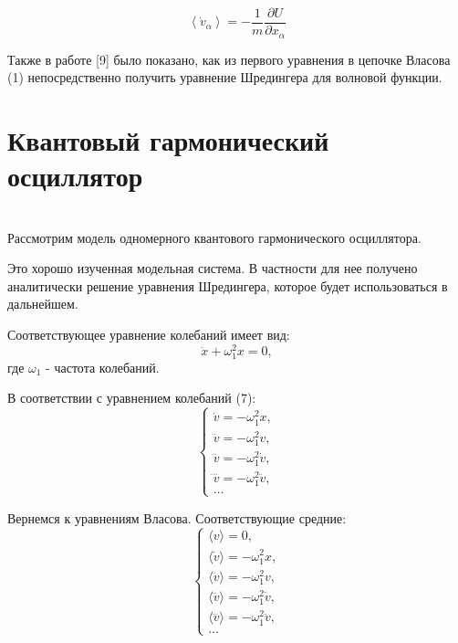 \documentclass[a4paper,14pt]{article}
\begin{document}
\begin{equation}
\left\langle\dot{v}_{\alpha}\right\rangle = -\frac{1}{m} \frac{\partial U}{\partial x_{\alpha}}
\end{equation}

Также в работе [9] было показано, как из первого уравнения в цепочке Власова (1) непосредственно получить уравнение Шредингера для волновой функции. 

\newpage
\section{Квантовый гармонический осциллятор}
~\\
Рассмотрим модель одномерного квантового гармонического осциллятора. 

Это хорошо изученная модельная система. В частности для нее получено аналитически решение уравнения Шредингера, которое будет использоваться в дальнейшем.

Соответствующее уравнение колебаний  имеет вид:
\begin{equation}
\ddot{x}+\omega_{1}^{2} x=0,
\end{equation}
где $\omega_1$ - частота колебаний.

В соответствии с уравнением колебаний (7):
\begin{equation}
\begin{cases}
\dot{v}=-\omega_{1}^{2} x,\\
\ddot{v}=-\omega_{1}^{2} v,\\
\dddot{v}=-\omega_{1}^{2} \dot{v},\\ 
\ddddot{v}=-\omega_{1}^{2} \ddot{v}, \\
\ldots
\end{cases}
\end{equation}

Вернемся к уравнениям Власова. Соответствующие средние:
\begin{equation}
\begin{cases}
\langle v\rangle= 0,\\
\langle\dot{v}\rangle=-\omega_{1}^{2} x,\\
\langle\ddot{v}\rangle=-\omega_{1}^{2} v,\\
\langle\dddot{v}\rangle=-\omega_{1}^{2} \dot{v},\\
\langle\ddddot{v}\rangle=-\omega_{1}^{2} \ddot{v},\\ 
\ldots
\end{cases}
\end{equation}
\end{document}
